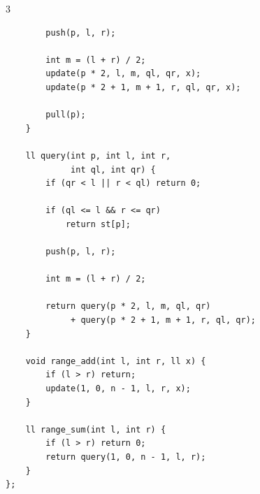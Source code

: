 \documentclass[8pt,a4paper,landscape]{article}
\begin{document}
\begin{multicols}{3}
\begin{lstlisting}
        push(p, l, r);

        int m = (l + r) / 2;
        update(p * 2, l, m, ql, qr, x);
        update(p * 2 + 1, m + 1, r, ql, qr, x);

        pull(p);
    }

    ll query(int p, int l, int r,
             int ql, int qr) {
        if (qr < l || r < ql) return 0;

        if (ql <= l && r <= qr)
            return st[p];

        push(p, l, r);

        int m = (l + r) / 2;

        return query(p * 2, l, m, ql, qr)
             + query(p * 2 + 1, m + 1, r, ql, qr);
    }

    void range_add(int l, int r, ll x) {
        if (l > r) return;
        update(1, 0, n - 1, l, r, x);
    }

    ll range_sum(int l, int r) {
        if (l > r) return 0;
        return query(1, 0, n - 1, l, r);
    }
};
\end{lstlisting}
\vspace{1pt}
\end{multicols}
\end{document}
